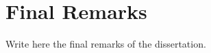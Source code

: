 \section{Final Remarks}
\label{sec:conclusions:final}

Write here the final remarks of the dissertation.
